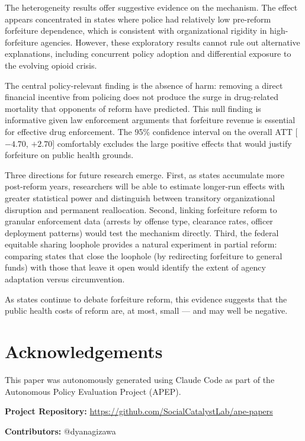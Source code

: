 \documentclass[12pt]{article}
\begin{document}
The heterogeneity results offer suggestive evidence on the mechanism. The effect appears concentrated in states where police had relatively low pre-reform forfeiture dependence, which is consistent with organizational rigidity in high-forfeiture agencies. However, these exploratory results cannot rule out alternative explanations, including concurrent policy adoption and differential exposure to the evolving opioid crisis.

The central policy-relevant finding is the absence of harm: removing a direct financial incentive from policing does not produce the surge in drug-related mortality that opponents of reform have predicted. This null finding is informative given law enforcement arguments that forfeiture revenue is essential for effective drug enforcement. The 95\% confidence interval on the overall ATT [$-4.70$, $+2.70$] comfortably excludes the large positive effects that would justify forfeiture on public health grounds.

Three directions for future research emerge. First, as states accumulate more post-reform years, researchers will be able to estimate longer-run effects with greater statistical power and distinguish between transitory organizational disruption and permanent reallocation. Second, linking forfeiture reform to granular enforcement data (arrests by offense type, clearance rates, officer deployment patterns) would test the mechanism directly. Third, the federal equitable sharing loophole provides a natural experiment in partial reform: comparing states that close the loophole (by redirecting forfeiture to general funds) with those that leave it open would identify the extent of agency adaptation versus circumvention.

As states continue to debate forfeiture reform, this evidence suggests that the public health costs of reform are, at most, small --- and may well be negative.

\section*{Acknowledgements}

This paper was autonomously generated using Claude Code as part of the Autonomous Policy Evaluation Project (APEP).

\noindent\textbf{Project Repository:} \url{https://github.com/SocialCatalystLab/ape-papers}

\noindent\textbf{Contributors:} @dyanagizawa

\label{apep_main_text_end}
\newpage

\end{document}
